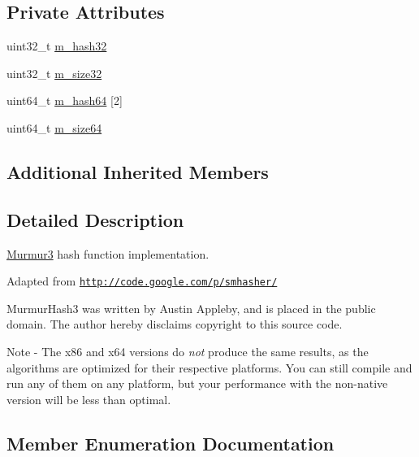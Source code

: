\subsection*{Private Attributes}
{\bf }\par
\begin{DoxyCompactItemize}
\item 
uint32\+\_\+t \hyperlink{classns3_1_1Hash_1_1Function_1_1Murmur3_a8a54e5cd90d08a8bd8f92d7f6a982e3f}{m\+\_\+hash32}
\item 
uint32\+\_\+t \hyperlink{classns3_1_1Hash_1_1Function_1_1Murmur3_a37952f402444600e609ed34001be29d9}{m\+\_\+size32}
\end{DoxyCompactItemize}

{\bf }\par
\begin{DoxyCompactItemize}
\item 
uint64\+\_\+t \hyperlink{classns3_1_1Hash_1_1Function_1_1Murmur3_a4f75089450577248e7da181266561d6e}{m\+\_\+hash64} \mbox{[}2\mbox{]}
\item 
uint64\+\_\+t \hyperlink{classns3_1_1Hash_1_1Function_1_1Murmur3_adb1bc6a1101d226afbc439b987b423c1}{m\+\_\+size64}
\end{DoxyCompactItemize}

\subsection*{Additional Inherited Members}


\subsection{Detailed Description}
\hyperlink{classns3_1_1Hash_1_1Function_1_1Murmur3}{Murmur3} hash function implementation. 

Adapted from \href{http://code.google.com/p/smhasher/}{\tt http\+://code.\+google.\+com/p/smhasher/}

Murmur\+Hash3 was written by Austin Appleby, and is placed in the public domain. The author hereby disclaims copyright to this source code.

Note -\/ The x86 and x64 versions do {\itshape not} produce the same results, as the algorithms are optimized for their respective platforms. You can still compile and run any of them on any platform, but your performance with the non-\/native version will be less than optimal. 

\subsection{Member Enumeration Documentation}
